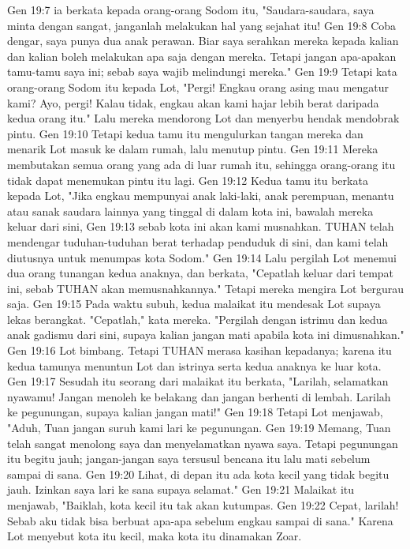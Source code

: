 Gen 19:7  ia berkata kepada orang-orang Sodom itu, "Saudara-saudara, saya minta dengan sangat, janganlah melakukan hal yang sejahat itu!
Gen 19:8  Coba dengar, saya punya dua anak perawan. Biar saya serahkan mereka kepada kalian dan kalian boleh melakukan apa saja dengan mereka. Tetapi jangan apa-apakan tamu-tamu saya ini; sebab saya wajib melindungi mereka."
Gen 19:9  Tetapi kata orang-orang Sodom itu kepada Lot, "Pergi! Engkau orang asing mau mengatur kami? Ayo, pergi! Kalau tidak, engkau akan kami hajar lebih berat daripada kedua orang itu." Lalu mereka mendorong Lot dan menyerbu hendak mendobrak pintu.
Gen 19:10  Tetapi kedua tamu itu mengulurkan tangan mereka dan menarik Lot masuk ke dalam rumah, lalu menutup pintu.
Gen 19:11  Mereka membutakan semua orang yang ada di luar rumah itu, sehingga orang-orang itu tidak dapat menemukan pintu itu lagi.
Gen 19:12  Kedua tamu itu berkata kepada Lot, "Jika engkau mempunyai anak laki-laki, anak perempuan, menantu atau sanak saudara lainnya yang tinggal di dalam kota ini, bawalah mereka keluar dari sini,
Gen 19:13  sebab kota ini akan kami musnahkan. TUHAN telah mendengar tuduhan-tuduhan berat terhadap penduduk di sini, dan kami telah diutusnya untuk menumpas kota Sodom."
Gen 19:14  Lalu pergilah Lot menemui dua orang tunangan kedua anaknya, dan berkata, "Cepatlah keluar dari tempat ini, sebab TUHAN akan memusnahkannya." Tetapi mereka mengira Lot bergurau saja.
Gen 19:15  Pada waktu subuh, kedua malaikat itu mendesak Lot supaya lekas berangkat. "Cepatlah," kata mereka. "Pergilah dengan istrimu dan kedua anak gadismu dari sini, supaya kalian jangan mati apabila kota ini dimusnahkan."
Gen 19:16  Lot bimbang. Tetapi TUHAN merasa kasihan kepadanya; karena itu kedua tamunya menuntun Lot dan istrinya serta kedua anaknya ke luar kota.
Gen 19:17  Sesudah itu seorang dari malaikat itu berkata, "Larilah, selamatkan nyawamu! Jangan menoleh ke belakang dan jangan berhenti di lembah. Larilah ke pegunungan, supaya kalian jangan mati!"
Gen 19:18  Tetapi Lot menjawab, "Aduh, Tuan jangan suruh kami lari ke pegunungan.
Gen 19:19  Memang, Tuan telah sangat menolong saya dan menyelamatkan nyawa saya. Tetapi pegunungan itu begitu jauh; jangan-jangan saya tersusul bencana itu lalu mati sebelum sampai di sana.
Gen 19:20  Lihat, di depan itu ada kota kecil yang tidak begitu jauh. Izinkan saya lari ke sana supaya selamat."
Gen 19:21  Malaikat itu menjawab, "Baiklah, kota kecil itu tak akan kutumpas.
Gen 19:22  Cepat, larilah! Sebab aku tidak bisa berbuat apa-apa sebelum engkau sampai di sana." Karena Lot menyebut kota itu kecil, maka kota itu dinamakan Zoar.
